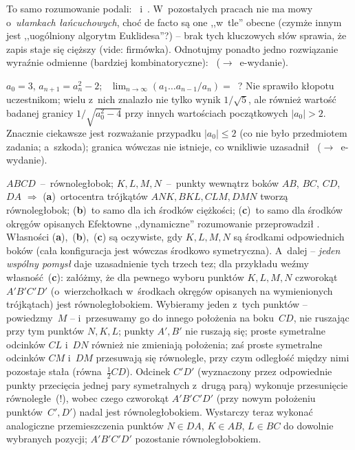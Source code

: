 {\begin{dwieszpalty}
To samo rozumowanie podali: \Dan\ i~\Kum. W~pozostałych pracach nie ma mowy o~{\it ułamkach łańcuchowych}, choć de facto są one ,,w~tle'' obecne (czymże innym jest ,,uogólniony algorytm Euklidesa''?) -- brak tych kluczowych słów sprawia, że zapis staje się cięższy (vide: firmówka). Odnotujmy ponadto jedno rozwiązanie wyraźnie odmienne (bardziej kombinatoryczne): \Ols\ ($\to$~e-wydanie).



{${a_0=3}$, ${a_{n+1}=a_n^2-2}$; \ ${\lim_{n\to\infty}(a_1\ldots{a_{n-1}}\slash{a_n})=}$~?}
Nie sprawiło kłopotu uczestnikom; wielu z~nich znalazło nie tylko wynik ${1\slash\sqrt5}$, ale również wartość badanej granicy ${1\slash\sqrt{a_0^2-4}}$ przy innych wartościach początkowych ${|a_0|>2}$. Znacznie ciekawsze jest rozważanie przypadku ${|a_0|\le2}$ (co nie było przedmiotem zadania; a~szkoda); granica wówczas nie istnieje, co wnikliwie uzasadnił \Ols\ ($\to$~e-wydanie).



{$ABCD$~--~równoległobok; $K,L,M,N$~--~punkty wewnątrz boków $AB$, $BC$, $CD$,~$DA$ $\Rightarrow$
({\bf{a}})~ortocentra trójkątów ${ANK,BKL,CLM,DMN}$ tworzą równoległobok;
({\bf{b}})~to samo dla ich środków ciężkości;
({\bf{c}})~to samo dla środków okręgów opisanych}
Efektowne ,,dynamiczne'' rozumowanie przeprowadził \Fie. Własności ({\bf{a}}),~({\bf{b}}),~({\bf{c}}) są oczywiste, gdy $K,L,M,N$ są środkami odpowiednich boków (cała konfiguracja jest wówczas środkowo symetryczna). A~dalej -- {\it jeden wspólny pomysł} daje uzasadnienie tych trzech tez; dla przykładu weźmy własność~({\bf{c}}): załóżmy, że dla pewnego wyboru punktów $K,L,M,N$ czworokąt $A'B'C'D'$ (o~wierzchołkach w~środkach okręgów opisanych na wymienionych trójkątach) jest równoległobokiem. Wybieramy jeden z~tych punktów -- powiedzmy~$M$ -- i~przesuwamy go do innego położenia na boku~$CD$, nie ruszając przy tym punktów $N,K,L$; punkty $A',B'$ nie ruszają się; proste symetralne odcinków $CL$ i~$DN$ również nie zmieniają położenia; zaś proste symetralne odcinków $CM$ i~$DM$ przesuwają się równolegle, przy czym odległość między nimi pozostaje stała (równa~$\frac12CD$). Odcinek $C'D'$ (wyznaczony przez odpowiednie punkty przecięcia jednej pary symetralnych z~drugą parą) wykonuje przesunięcie równoległe~(!), wobec czego czworokąt $A'B'C'D'$ (przy nowym położeniu punktów~$C',D'$) nadal jest równoległobokiem. Wystarczy teraz wykonać analogiczne przemieszczenia punktów ${N\in{DA}}$, ${K\in{AB}}$, ${L\in{BC}}$ do dowolnie wybranych pozycji; $A'B'C'D'$ pozostanie równoległobokiem.


\end{dwieszpalty}}
